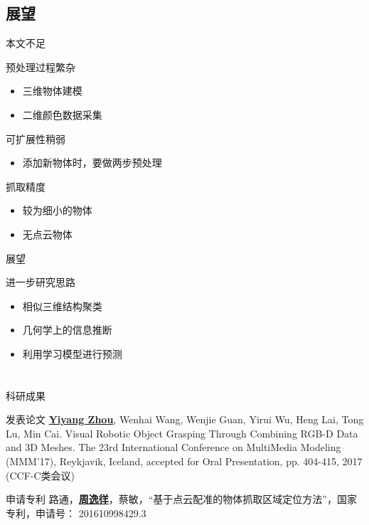 \documentclass[xcolor=table,compress,blue]{beamer}
\begin{document}
\subsection{展望}
\begin{frame}{本文不足}
	\begin{exampleblock}{预处理过程繁杂}
		\begin{itemize}
			\item 三维物体建模
			\item 二维颜色数据采集
		\end{itemize}
	\end{exampleblock}
	\begin{exampleblock}{可扩展性稍弱}
		\begin{itemize}
			\item 添加新物体时，要做两步预处理
		\end{itemize}
	\end{exampleblock} 
	 \begin{exampleblock}{抓取精度}
	 	\begin{itemize}
	 		\item 较为细小的物体
	 		\item 无点云物体
	 	\end{itemize}
	 \end{exampleblock}
 
\end{frame}	

\begin{frame}{展望}
	\begin{exampleblock}{进一步研究思路}
		\begin{itemize}
			\item 相似三维结构聚类
			\item 几何学上的信息推断
			\item 利用学习模型进行预测
		\end{itemize}
	\end{exampleblock}
\end{frame}


\section{}
\begin{frame}{科研成果}
	\begin{exampleblock}{发表论文}
		\textbf{\underline{Yiyang Zhou}}, Wenhai Wang, Wenjie Guan, Yirui Wu, Heng Lai, Tong Lu, Min Cai. Visual Robotic Object Grasping Through Combining RGB-D Data and 3D Meshes. The 23rd International Conference on MultiMedia Modeling (MMM’17), Reykjavik, Iceland, accepted for Oral Presentation, pp. 404-415, 2017 (CCF-C类会议)
	\end{exampleblock}
	\begin{exampleblock}{申请专利}
		路通，\textbf{\underline{周逸徉}}，蔡敏，“基于点云配准的物体抓取区域定位方法”，国家专利，申请号： 201610998429.3
	\end{exampleblock}
\end{frame}
\end{document}
